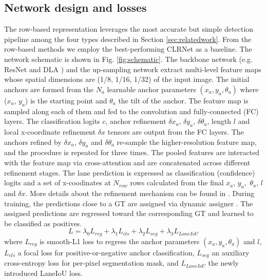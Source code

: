 \documentclass[10pt,twocolumn,letterpaper]{article}
\begin{document}
\subsection{Network design and losses}
The row-based representation \cite{Zheng_2022_CVPR, Liu_2021_ICCV, tabelini2021cvpr} leverages the most accurate but simple detection pipeline among the four types described in Section \ref{sec:relatedwork}. From the row-based methods we employ the best-performing CLRNet \cite{Zheng_2022_CVPR} as a baseline. 
The network schematic is shown in Fig. \ref{fig:schematic}.
The backbone network (e.g. ResNet \cite{He_2016_CVPR} and DLA \cite{Yu_2018_CVPR}) and the up-sampling network extract multi-level feature maps whose spatial dimensions are (1/8, 1/16, 1/32) of the input image.
The initial anchors are formed from the $N_a$ learnable anchor parameters $(x_a, y_a, \theta_a)$ where ($x_a$, $y_a$) is the starting point and $\theta_a$ the tilt of the anchor.
The feature map is sampled along each of them and fed to the convolution and fully-connected (FC) layers.
The classification logits $c$, anchor refinement $\delta x_a$, $\delta y_a$, $\delta \theta_a$, length $l$ and local x-coordinate refinement $\delta x$ tensors are output from the FC layers. 
The anchors refined by $\delta x_a$, $\delta y_a$ and $\delta \theta_a$ re-sample the higher-resolution feature map, and the procedure is repeated for three times.
The pooled features are interacted with the feature map via cross-attention and are concatenated across different refinement stages.
The lane prediction is expressed as classification (confidence) logits and a set of x-coodinates at $N_{row}$ rows calculated from the final $x_a$, $y_a,$ $\theta_a$, $l$ and $\delta x$.
More details about the refinement mechanism can be found in \cite{Zheng_2022_CVPR}.
During training, the predictions close to a GT are assigned via dynamic assigner \cite{YOLOX}.
The assigned predictions are regressed toward the corresponding GT and learned to be classified as positives. 
\begin{equation}
\label{eq:lossses}
L= \lambda_0 L_{reg} + \lambda_1 L_{cls} + \lambda_2 L_{seg} + \lambda_3 L_{LaneIoU}
\end{equation}
where $L_{reg}$ is smooth-L1 loss to regress the anchor parameters $(x_a, y_a, \theta_a)$ and $l$, $L_{cls}$ a focal loss \cite{focalloss} for positive-or-negative anchor classification, $L_{seg}$ an auxiliary cross-entropy loss for per-pixel segmentation mask, and  $L_{LaneIoU}$ the newly introduced LaneIoU loss. 
\end{document}
